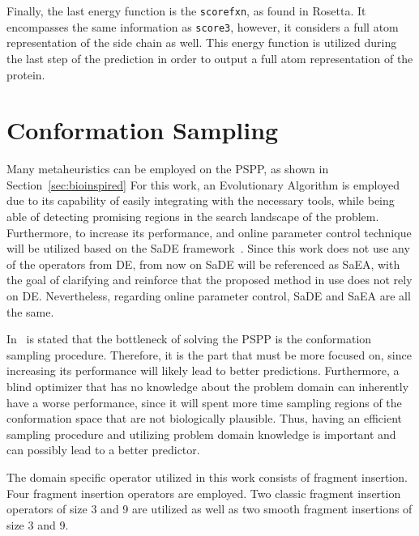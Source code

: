 Finally, the last energy function is the \texttt{scorefxn}, as found in Rosetta. It
encompasses the same information as \texttt{score3}, however, it considers a full atom
representation of the side chain as well. This energy function is utilized
during the last step of the prediction in order to output a full atom
representation of the protein.

\section{Conformation Sampling}
\label{sec:conformation-sampling}

Many metaheuristics can be employed
on the \ac{PSPP}, as shown in Section~\ref{sec:bioinspired}
For this work, an Evolutionary Algorithm is employed due to its capability
of easily integrating with the necessary tools,
while being able of detecting promising regions in the search landscape of the
problem. Furthermore, to increase
its performance, and online parameter control technique will be
utilized based on the \ac{SaDE} framework~\cite{qin2005self,qin2009differential}.
Since this work does not use any of the operators from \ac{DE}, from now on
\ac{SaDE} will be referenced as \ac{SaEA}, with the goal of clarifying
and reinforce that the proposed method in use does not rely on \ac{DE}.
Nevertheless, regarding online parameter control, \ac{SaDE} and \ac{SaEA}
are all the same.

In~\cite{kim2009sampling} is stated that the bottleneck of solving the
\ac{PSPP} is the conformation sampling procedure. Therefore, it is the part
that must be more focused on, since increasing its performance will likely lead
to better predictions. Furthermore, a blind optimizer that has no knowledge
about the problem domain can inherently have a worse performance, since it will
spent more time sampling regions of the conformation space that are not
biologically plausible. Thus, having an efficient sampling procedure and
utilizing problem domain knowledge is important and can possibly lead to a
better predictor.

The domain specific operator utilized in this work consists of
fragment insertion. Four fragment insertion operators are employed.
Two classic fragment insertion operators of size 3 and 9 are utilized
as well as two smooth fragment insertions of size 3 and 9.

